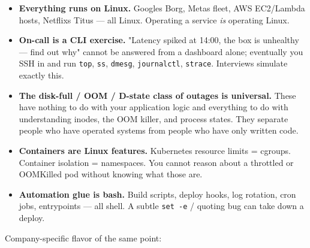 \documentclass[11pt]{article}
\providecommand{\tightlist}{\setlength{\itemsep}{1pt}\setlength{\parskip}{0pt}}
\begin{document}
\begin{itemize}
\tightlist
\item
  \textbf{Everything runs on Linux.} Google\textquotesingle s Borg, Meta\textquotesingle s fleet, AWS EC2/Lambda hosts, Netflix\textquotesingle s Titus --- all Linux. Operating a service \emph{is} operating Linux.
\item
  \textbf{On-call is a CLI exercise.} "Latency spiked at 14:00, the box is unhealthy --- find out why" cannot be answered from a dashboard alone; eventually you SSH in and run \texttt{top}, \texttt{ss}, \texttt{dmesg}, \texttt{journalctl}, \texttt{strace}. Interviews simulate exactly this.
\item
  \textbf{The disk-full / OOM / D-state class of outages is universal.} These have nothing to do with your application logic and everything to do with understanding inodes, the OOM killer, and process states. They separate people who have operated systems from people who have only written code.
\item
  \textbf{Containers are Linux features.} Kubernetes resource limits = cgroups. Container isolation = namespaces. You cannot reason about a throttled or OOMKilled pod without knowing what those are.
\item
  \textbf{Automation glue is bash.} Build scripts, deploy hooks, log rotation, cron jobs, entrypoints --- all shell. A subtle \texttt{set\ -e} / quoting bug can take down a deploy.
\end{itemize}

Company-specific flavor of the same point:
\end{document}
